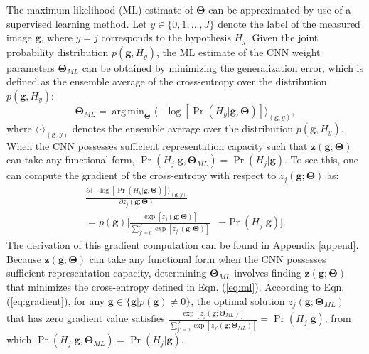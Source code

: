 \documentclass[journal]{IEEEtran}
\renewcommand{\vec}[1]{\mathbf{#1}}
\DeclareMathOperator*{\argmin}{arg\,min}
\begin{document}
The maximum likelihood (ML) estimate of $\bm\Theta$ can be approximated by use of a supervised learning method{\cite{kupinski2001ideal}}.
Let $y\in \{0,1,...,J\}$ denote the label of the measured image $\vec{g}$, where $y = j$ corresponds to the hypothesis $H_j$. 
{Given the joint probability distribution $p(\vec{g}, H_y)$,} the ML estimate of the CNN weight parameters $\bm\Theta_{ML}$
can be obtained by minimizing the generalization error, which is defined as the ensemble average of the cross-entropy over the distribution $p(\vec{g}, {H_y})$\cite{kupinski2001ideal,zhou2019approximating}:
\begin{equation}\label{eq:ml}
\bm\Theta_{ML} = \argmin_{\bm\Theta} \langle-\log[\Pr(H_y|\vec{g}, \bm\Theta)]\rangle_{(\vec{g}, y)},
\end{equation}
where $\langle \cdot \rangle_{(\vec{g}, y)}$ denotes the ensemble average over the distribution $p(\vec{g}, {H_y})$. When the CNN possesses sufficient representation capacity such that $\vec{z}(\vec{g}; \bm\Theta)$ can take any functional form, 
$\Pr(H_j | \vec{g}, \bm\Theta_{ML}) = \Pr(H_j | \vec{g})$.
To see this, one can 
compute the gradient of the cross-entropy with respect to ${z}_j(\vec{g}; \bm\Theta)$ as:
\begin{equation}\label{eq:gradient}
\begin{aligned}
\frac{\partial  \langle-\log[\Pr({H_y}|\vec{g}, \bm\Theta)]\rangle_{(\vec{g}, y)}}{\partial z_j(\vec{g}; \bm\Theta)}&
\\
= p(\vec{g})\Big[\frac{\exp[{z_j(\vec{g}; \bm\Theta)}]}{\sum_{j'=0}^{J}\exp[{z_{j'}(\vec{g}; \bm\Theta)}]} &- \Pr(H_j|\vec{g})\Big].
\end{aligned}
\end{equation}
The derivation of this gradient computation can be found in Appendix \ref{append}.
Because $\vec{z}(\vec{g}; \bm\Theta)$ can take any functional form when the CNN possesses sufficient
 representation capacity,
determining $\bm\Theta_{ML}$ involves finding $\vec{z}(\vec{g}; \bm\Theta)$ that minimizes the cross-entropy defined in Eqn. (\ref{eq:ml}).
According to Eqn. (\ref{eq:gradient}), for any $\vec{g}\in \{\vec{g}| p(\vec{g})\neq 0 \}$, the optimal solution $z_j(\vec{g}; \bm\Theta_{ML})$ that has zero gradient value
satisfies $\frac{\exp[{z_j(\vec{g}; \bm\Theta_{ML})}]}{\sum_{j'=0}^{J}\exp[{z_{j'}(\vec{g}; \bm\Theta_{ML})}]}  = \Pr(H_j|\vec{g})$,
from which $\Pr(H_j | \vec{g}, \bm\Theta_{ML}) = \Pr(H_j|\vec{g})$.
\end{document}
